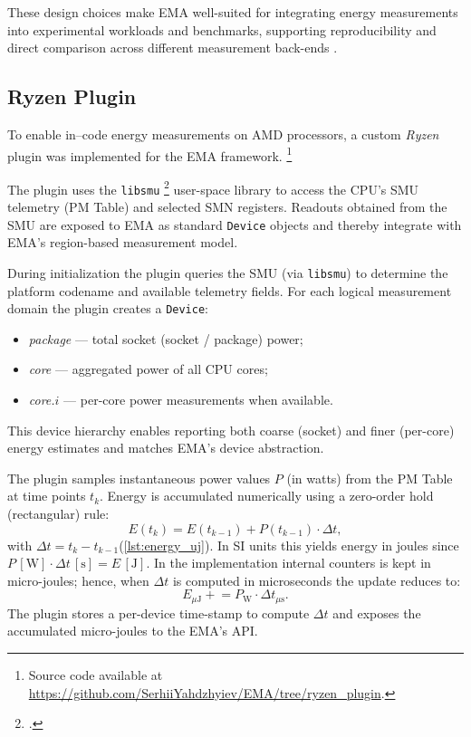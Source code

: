 These design choices make \gls{EMA} well-suited for integrating energy
measurements into experimental workloads and benchmarks, supporting
reproducibility and direct comparison across different measurement back-ends
\parencite{NAAICE}.

\subsection{Ryzen Plugin}

To enable in--code energy measurements on AMD processors, a custom
\textit{Ryzen} plugin was implemented for the \gls{EMA} framework.
\footnote{Source code available at
\url{https://github.com/SerhiiYahdzhyiev/EMA/tree/ryzen_plugin}.}

The plugin uses the \texttt{libsmu} \footcite{RyzenSMU_GitHub} user-space
library to access the \gls{CPU}'s \gls{SMU} telemetry (\gls{PM} Table) and
selected \gls{SMN} registers. Readouts obtained
from the \gls{SMU} are exposed to \gls{EMA} as standard \texttt{Device} objects and
thereby integrate with \gls{EMA}'s region-based measurement model.

During initialization the plugin queries the \gls{SMU} (via \texttt{libsmu})
to determine the platform codename and available telemetry fields. For
each logical measurement domain the plugin creates a \texttt{Device}:
\begin{itemize}
  \item \emph{package} — total socket (socket / package) power;
  \item \emph{core}  — aggregated power of all CPU cores;
  \item \emph{core.\(i\)} — per-core power measurements when available.
\end{itemize}
This device hierarchy enables reporting both coarse (socket) and finer
(per-core) energy estimates and matches \gls{EMA}'s device abstraction.

The plugin samples instantaneous power values \(P\) (in watts) from the
\gls{PM} Table at time points \(t_k\). Energy is accumulated numerically
using a zero-order hold (rectangular) rule:
\[
  E(t_k) = E(t_{k-1}) + P(t_{k-1}) \cdot \Delta t,
\]
with \(\Delta t = t_k - t_{k-1}\)(\cref{lst:energy_uj}). In SI units this
yields energy in joules since
\(P\,[\mathrm{W}]\cdot\Delta t\,[\mathrm{s}] = E\,[\mathrm{J}]\).
In the implementation internal counters is kept in micro-joules; hence,
when \(\Delta t\) is computed in microseconds the update reduces to:
\[
  E_{\mu\mathrm{J}} \mathrel{+}= P_{\mathrm{W}} \cdot \Delta t_{\mu\mathrm{s}}.
\]
The plugin stores a per-device time-stamp to compute \(\Delta t\) and
exposes the accumulated micro-joules to the \gls{EMA}'s API.

